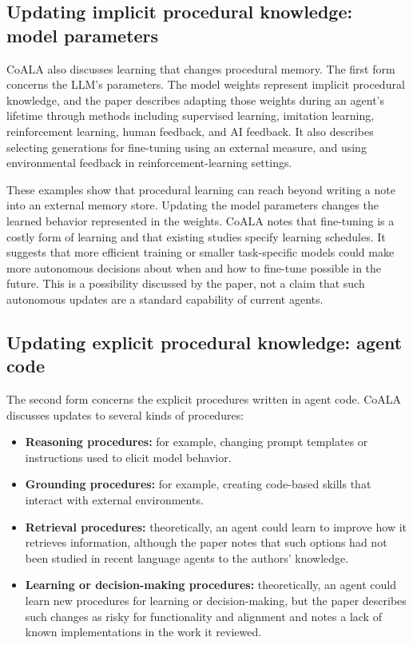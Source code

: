 \subsection{Updating implicit procedural knowledge: model parameters}

CoALA also discusses learning that changes procedural memory. The first form concerns the LLM's parameters. The model weights represent implicit procedural knowledge, and the paper describes adapting those weights during an agent's lifetime through methods including supervised learning, imitation learning, reinforcement learning, human feedback, and AI feedback. It also describes selecting generations for fine-tuning using an external measure, and using environmental feedback in reinforcement-learning settings.

These examples show that procedural learning can reach beyond writing a note into an external memory store. Updating the model parameters changes the learned behavior represented in the weights. CoALA notes that fine-tuning is a costly form of learning and that existing studies specify learning schedules. It suggests that more efficient training or smaller task-specific models could make more autonomous decisions about when and how to fine-tune possible in the future. This is a possibility discussed by the paper, not a claim that such autonomous updates are a standard capability of current agents.

\subsection{Updating explicit procedural knowledge: agent code}

The second form concerns the explicit procedures written in agent code. CoALA discusses updates to several kinds of procedures:

\begin{itemize}
  \item \textbf{Reasoning procedures:} for example, changing prompt templates or instructions used to elicit model behavior.
  \item \textbf{Grounding procedures:} for example, creating code-based skills that interact with external environments.
  \item \textbf{Retrieval procedures:} theoretically, an agent could learn to improve how it retrieves information, although the paper notes that such options had not been studied in recent language agents to the authors' knowledge.
  \item \textbf{Learning or decision-making procedures:} theoretically, an agent could learn new procedures for learning or decision-making, but the paper describes such changes as risky for functionality and alignment and notes a lack of known implementations in the work it reviewed.
\end{itemize}


